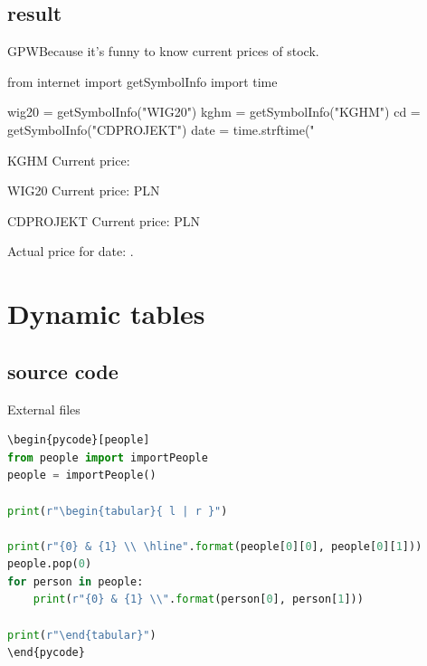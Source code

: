 \documentclass[
aspectratio=1610,
hyperref={pdfpagemode=FullScreen},
english,
usenames,
dvipsnames
]
{beamer} %
\begin{document}
\subsection{result}
\begin{frame}[fragile]{GPW}{Because it's funny to know current prices of stock.}
\begin{pycode}[internet]
from internet import getSymbolInfo
import time

wig20 = getSymbolInfo("WIG20")
kghm = getSymbolInfo("KGHM")
cd = getSymbolInfo("CDPROJEKT")
date = time.strftime("%
\end{pycode}


\begin{exampleblock}{KGHM}
Current price: 
\end{exampleblock}

\begin{exampleblock}{WIG20}
Current price:  PLN
\end{exampleblock}

\begin{exampleblock}{CDPROJEKT}
Current price:  PLN
\end{exampleblock}

Actual price for date: .

\onslide
\end{frame}

\section{Dynamic tables}
\subsection{source code}
\begin{frame}[fragile]{External files}
\begin{lstlisting}[language=python]
\begin{pycode}[people]
from people import importPeople
people = importPeople()	

print(r"\begin{tabular}{ l | r }")

print(r"{0} & {1} \\ \hline".format(people[0][0], people[0][1]))
people.pop(0)
for person in people:
	print(r"{0} & {1} \\".format(person[0], person[1]))
	
print(r"\end{tabular}")
\end{pycode}

\end{lstlisting}
\end{frame}
\end{document}
